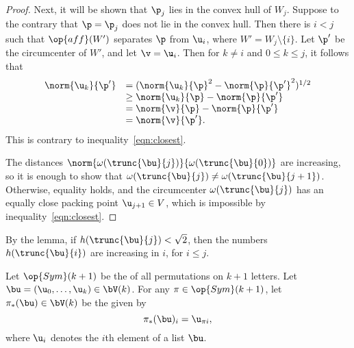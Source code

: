 \begin{proof}
%
 Next, it will be shown that $\p_j$ lies in the
convex hull of $W_j$.
Suppose to the contrary that $\p=\p_j$ does not lie in the convex
hull. Then there is $i<j$ such that $\op{aff}(W')$ separates $\p$ from
$ \u_i$, where $W'=W_j\setminus\{i\}$.  Let $\p'$ be the circumcenter
of $W'$, and let $\v= \u_i$.  Then for $k\ne i$ and $0\le k\le j$, it
follows that
\begin{displaymath}
\begin{array}{lll}
\norm{ \u_k}{\p'} &= (\norm{ \u_k}{\p}^2 - \norm{\p}{\p'}^2)^{1/2} \\
&\ge \norm{ \u_k}{\p} - \norm{\p}{\p'} \\
&=\norm{\v}{\p} - \norm{\p}{\p'}\\
&=\norm{\v}{\p'}.
\end{array}
\end{displaymath}
This is contrary to inequality~\ref{eqn:closest}.


 The distances
$\norm{\omega(\trunc{\bu}{j})}{\omega(\trunc{\bu}{0})}$ are increasing, so it is
enough to show that $\omega(\trunc{\bu}{j})\ne \omega(\trunc{\bu}{j+1})$.  Otherwise,
equality holds, and the circumcenter $\omega(\trunc{\bu}{j})$ has an equally
close packing point $ \u_{j+1}\in V$, which is impossible by
inequality~\ref{eqn:closest}.
\end{proof}





By the lemma, if $h(\trunc{\bu}{j})<\sqrt2$, then the numbers $h(\trunc{\bu}{i})$ are
increasing in $i$, for $i\le j$.


Let $\op{Sym}(k+1)$ be the  of all permutations on $k+1$ letters.
Let $\bu = ( \u_0,\ldots, \u_k)\in \bV(k)$.  For any 
$\pi\in\op{Sym}(k+1)$, let $\pi_*(\bu)\in \bV(k)$ be the  given by
\begin{displaymath}
\pi_*(\bu)_i =  \u_{\pi i},
\end{displaymath}   
where $\u_i$ denotes the $i$th element of a list $\bu$.


